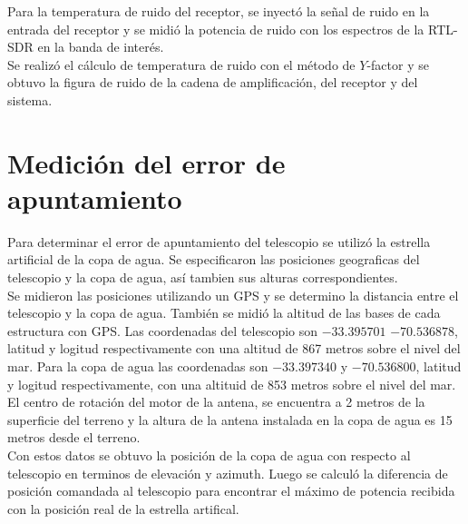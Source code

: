 Para la temperatura de ruido del receptor, se inyectó la señal de ruido en la entrada del receptor y se midió la potencia de ruido con los espectros de la RTL-SDR en la banda de interés.\\


Se realizó el cálculo de temperatura de ruido con el método de $Y$-factor y se obtuvo la figura de ruido de la cadena de amplificación, del receptor y del sistema.\\


\section{Medición del error de apuntamiento}

Para determinar el error de apuntamiento del telescopio se utilizó la estrella artificial de la copa de agua. Se especificaron las posiciones geograficas del telescopio y la copa de agua, así tambien sus alturas correspondientes.\\

Se midieron las posiciones utilizando un GPS y se determino la distancia entre el telescopio y la copa de agua. También se midió la altitud de las bases de cada estructura con GPS. Las coordenadas del telescopio son $-33.395701$ $-70.536878$, latitud y logitud respectivamente con una altitud de 867 metros sobre el nivel del mar. Para la copa de agua las coordenadas son $-33.397340$ y $-70.536800$, latitud y logitud respectivamente, con una altituid de 853 metros sobre el nivel del mar.\\

El centro de rotación del motor de la antena, se encuentra a 2 metros de la superficie del terreno y la altura de la antena instalada en la copa de agua es 15 metros desde el terreno.\\

Con estos datos se obtuvo la posición de la copa de agua con respecto al telescopio en terminos de elevación y azimuth. Luego se calculó la diferencia de posición comandada al telescopio para encontrar el máximo de potencia recibida con la posición real de la estrella artifical.\\

